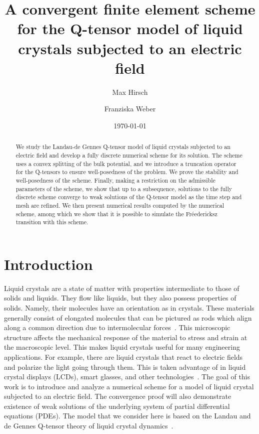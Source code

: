 \documentclass[10pt,letterpaper]{amsart}
\title[Maxwell Q-tensor]{A convergent finite element scheme for the Q-tensor model of liquid crystals subjected to an electric field}
\date{\today}
\author[M. Hirsch]{Max Hirsch}
\author[F. Weber]{Franziska Weber}
\theoremstyle{definition}{\newtheorem{definition}[lemma]{Definition}}
\theoremstyle{note}{\newtheorem{claim}{Claim}[section]
\newtheorem*{claim*}{Claim}}
\numberwithin{equation}{section}
\begin{document}
\maketitle
\begin{abstract}
We study the Landau-de Gennes Q-tensor model of liquid crystals subjected to an electric field and develop a fully discrete numerical scheme for its solution. The scheme uses a convex splitting of the bulk potential, and we introduce a truncation operator for the Q-tensors to ensure well-posedness of the problem. We prove the stability and well-posedness of the scheme.  Finally, making a restriction on the admissible parameters of the scheme, we show that up to a subsequence, solutions to the fully discrete scheme converge to weak solutions of the Q-tensor model as the time step and mesh are refined. We then present numerical results computed by the numerical scheme, among which we show that it is possible to simulate the Fr\'{e}edericksz transition with this scheme. 
\end{abstract}
\section{Introduction}
Liquid crystals are a state of matter with properties intermediate to those of solids and liquids. They flow like liquids, but they also possess properties of solids. Namely, their molecules have an orientation as in crystals. These materials generally consist of elongated molecules that can be pictured as rods which align along a common direction due to intermolecular forces~\cite{Virga1995,SonnetVirga2001,Stewart2008}. This microscopic structure affects the mechanical response of the material to stress and strain at the macroscopic level. This makes liquid crystals useful for many engineering applications. For example, there are liquid crystals that react to electric fields and polarize the light going through them. This is taken advantage of in liquid crystal displays (LCDs), smart glasses, and other technologies~\cite{Chang2022,Castellano2005,Loo2006}.
The goal of this work is to introduce and analyze a numerical scheme for a model of liquid crystal subjected to an electric field. The convergence proof will also demonstrate existence of weak solutions of the underlying system of partial differential equations (PDEs). The model that we consider here is based on the Landau and de Gennes Q-tensor theory of liquid crystal dynamics~\cite{Virga1995,deGennes1995}. 
\end{document}
